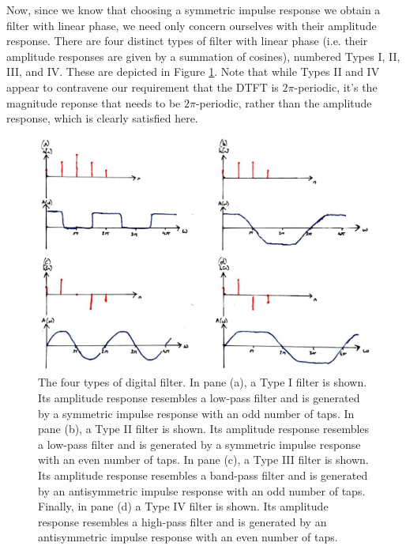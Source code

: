 Now, since we know that choosing a symmetric impulse response we obtain a filter
with linear phase, we need only concern ourselves with their amplitude response.
There are four distinct types of filter with linear phase (i.e. their amplitude
responses are given by a summation of cosines), numbered Types I, II, III, and IV.
These are depicted in Figure \ref{fig::lecture_16_filter_types}.
Note that while Types II and IV appear to
contravene our requirement that the DTFT is $2\pi$-periodic, it's the magnitude
reponse that needs to be $2\pi$-periodic, rather than the amplitude response, which
is clearly satisfied here.\\
%
\begin{figure}[H]
  \includegraphics[width=\textwidth]{images/lecture_16_filter_Types.JPG}
  \caption{The four types of digital filter. In pane (a), a Type I filter
    is shown. Its amplitude response resembles a low-pass filter and is
    generated by a symmetric impulse response with an odd number of taps. In pane (b),
    a Type II filter is shown. Its amplitude response resembles a low-pass filter
    and is generated by a symmetric impulse response with an even number of taps.
    In pane (c), a Type III filter is shown. Its amplitude response resembles
    a band-pass filter and is generated by an antisymmetric impulse response
    with an odd number of taps. Finally, in pane (d) a Type IV filter is
    shown. Its amplitude response resembles a high-pass filter  and is generated
    by an antisymmetric impulse response with an even number of taps.
  }
  \label{fig::lecture_16_filter_types}
\end{figure}

